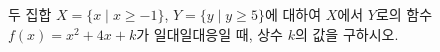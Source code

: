 두 집합 $X=\{x \mid x\ge -1\}$, $Y=\{y \mid y\ge 5\}$에 대하여 $X$에서 $Y$로의 함수 $f(x)=x^2+4x+k$가 일대일대응일 때, 상수 $k$의 값을 구하시오.
